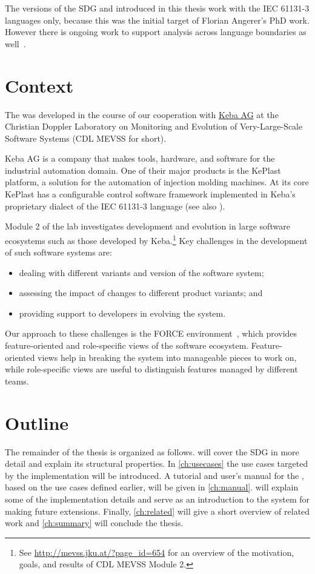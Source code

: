 The versions of the SDG and \SB introduced in this thesis work with the IEC 61131-3 languages only, because this was 
the initial target of Florian Angerer's PhD work. However there is ongoing work to support analysis across language 
boundaries as well~\cite{DBLP:conf/kbse/Angerer14}.


\section{Context}

The \SB was developed in the course of our cooperation with \href{http://www.keba.com}{Keba AG} at the Christian 
Doppler Laboratory on Monitoring and Evolution of Very-Large-Scale Software Systems (CDL MEVSS for short).

Keba AG is a company that makes tools, hardware, and software for the industrial automation domain. One of their major 
products is the KePlast platform, a solution for the automation of injection molding machines. At its core KePlast has 
a configurable control software framework implemented in Keba's proprietary dialect of the IEC 61131-3 language (see 
also \cite[sec.~3.1]{DBLP:conf/splc/AngererPLGG14}).

Module 2 of the lab investigates development and evolution in large software ecosystems such as those developed by 
Keba.\footnote{See \url{http://mevss.jku.at/?page_id=654} for an overview of the motivation, goals, and results of CDL 
MEVSS Module 2.}
Key challenges in the development of such software systems are:

\begin{itemize}
  \item dealing with different variants and version of the software system;
  \item assessing the impact of changes to different product variants; and
  \item providing support to developers in evolving the system.
\end{itemize}

Our approach to these challenges is the FORCE environment~\cite{HinterreiterDA}, which provides feature-oriented and 
role-specific views of the software ecosystem. Feature-oriented views help in breaking the system into manageable 
pieces to work on, while role-specific views are useful to distinguish features managed by different teams.


\section{Outline}

The remainder of the thesis is organized as follows.
 will cover the SDG in more detail and explain its structural properties.
In \autoref{ch:usecases} the use cases targeted by the \SB implementation will be introduced.
A tutorial and user's manual for the \SB, based on the use cases defined earlier, will be given in \autoref{ch:manual}.
 will explain some of the implementation details and serve as an introduction to the system for making
future extensions.
Finally, \autoref{ch:related} will give a short overview of related work and \autoref{ch:summary} will conclude the 
thesis.
